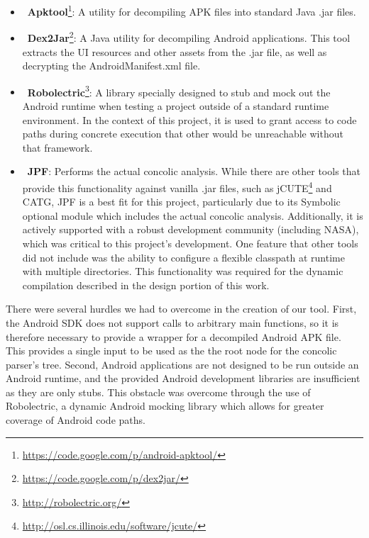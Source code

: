 \documentclass{sig-alternate}
\begin{document}
\begin{itemize}
    \setlength{\itemsep}{0pt} %
    \setlength{\parskip}{0pt} %
    \setlength{\parsep}{0pt}  %
    
\item~\textbf{Apktool}\footnote{\url{https://code.google.com/p/android-apktool/}}: A utility for decompiling APK files into standard Java .jar files.

\item~\textbf{Dex2Jar}\footnote{\url{https://code.google.com/p/dex2jar/}}: A Java utility for decompiling Android applications. This tool extracts the UI resources and other assets from the .jar file, as well as decrypting the AndroidManifest.xml file.

\item~\textbf{Robolectric}\footnote{\url{http://robolectric.org/}}: A library specially designed to stub and mock out the Android runtime when testing a project outside of a standard runtime environment. In the context of this project, it is used to grant access to code paths during concrete execution that other would be unreachable without that framework.

\item~\textbf{JPF}\cite{visser2003model}: Performs the actual concolic analysis.  While there are other tools that provide this functionality against vanilla .jar files, such as jCUTE\footnote{\url{http://osl.cs.illinois.edu/software/jcute/}} and CATG, JPF is a best fit for this project, particularly due to its Symbolic optional module which includes the actual concolic analysis. Additionally, it is actively supported with a robust development community (including NASA), which was critical to this project's development. One feature that other tools did not include was the ability to configure a flexible classpath at runtime with multiple directories. This functionality was required for the dynamic compilation described in the design portion of this work.
\end{itemize}

There were several hurdles we had to overcome in the creation of our tool. First, the Android SDK does not support calls to arbitrary main functions, so it is therefore necessary to provide a wrapper for a decompiled Android APK file. This provides a single input to be used as the the root node for the concolic parser's tree. Second, Android applications are not designed to be run outside an Android runtime, and the provided Android development libraries are insufficient as they are only stubs. This obstacle was overcome through the use of Robolectric, a dynamic Android mocking library which allows for greater coverage of Android code paths.
\end{document}
